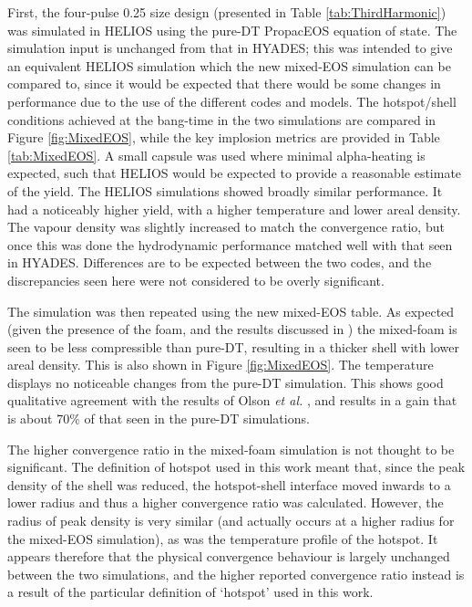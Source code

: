 First, the four-pulse 0.25 size design (presented in Table \ref{tab:ThirdHarmonic}) was simulated in HELIOS using the pure-DT PropacEOS equation of state. The simulation input is unchanged from that in HYADES; this was intended to give an equivalent HELIOS simulation which the new mixed-EOS simulation can be compared to, since it would be expected that there would be some changes in performance due to the use of the different codes and models. The hotspot/shell conditions achieved at the bang-time in the two simulations are compared in Figure \ref{fig:MixedEOS}, while the key implosion metrics are provided in Table \ref{tab:MixedEOS}. A small capsule was used where minimal alpha-heating is expected, such that HELIOS would be expected to provide a reasonable estimate of the yield. The HELIOS simulations showed broadly similar performance. It had a noticeably higher yield, with a higher temperature and lower areal density. The vapour density was slightly increased to match the convergence ratio, but once this was done the hydrodynamic performance matched well with that seen in HYADES. Differences are to be expected between the two codes, and the discrepancies seen here were not considered to be overly significant.

The simulation was then repeated using the new mixed-EOS table. As expected (given the presence of the foam, and the results discussed in \cite{Olson2021}) the mixed-foam is seen to be less compressible than pure-DT, resulting in a thicker shell with lower areal density. This is also shown in Figure  \ref{fig:MixedEOS}. The temperature displays no noticeable changes from the pure-DT simulation. This shows good qualitative agreement with the results of Olson \textit{et al.} \cite{Olson2020a}, and results in a gain that is about 70\% of that seen in the pure-DT simulations.

The higher convergence ratio in the mixed-foam simulation is not thought to be significant. The definition of hotspot used in this work meant that, since the peak density of the shell was reduced, the hotspot-shell interface moved inwards to a lower radius and thus a higher convergence ratio was calculated. However, the radius of peak density is very similar (and actually occurs at a higher radius for the mixed-EOS simulation), as was the temperature profile of the hotspot. It appears therefore that the physical convergence behaviour is largely unchanged between the two simulations, and the higher reported convergence ratio instead is a result of the particular definition of `hotspot' used in this work.

